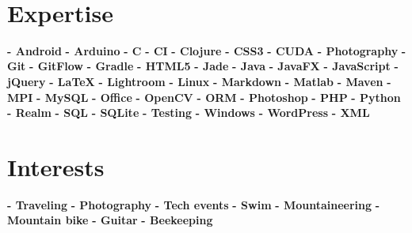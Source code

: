 \documentclass[]{friggeri-cv}
\begin{document}
\begin{aside}
~
~
~
  \section{\vspace{0.49cm}Expertise}
    \textbf{- Android}
    \textbf{- Arduino}
    \textbf{- C}
    \textbf{- CI}    
    \textbf{- Clojure}
    \textbf{- CSS3}
    \textbf{- CUDA}
    \textbf{- Photography}
    \textbf{- Git}
    \textbf{- GitFlow}    
    \textbf{- Gradle}
    \textbf{- HTML5}
    \textbf{- Jade}
    \textbf{- Java}
    \textbf{- JavaFX}
    \textbf{- JavaScript}
    \textbf{- jQuery}
    \textbf{- \LaTeX}
    \textbf{- Lightroom}
    \textbf{- Linux}
    \textbf{- Markdown}
    \textbf{- Matlab}
    \textbf{- Maven}
    \textbf{- MPI}
    \textbf{- MySQL}
    \textbf{- Office}
    \textbf{- OpenCV}
    \textbf{- ORM}
    \textbf{- Photoshop}
    \textbf{- PHP}
    \textbf{- Python}
    \textbf{- Realm}
    \textbf{- SQL}
    \textbf{- SQLite}    
    \textbf{- Testing}
    \textbf{- Windows}
    \textbf{- WordPress}
    \textbf{- XML}
    ~
  \section{Interests}
    \textbf{- Traveling}
    \textbf{- Photography}
    \textbf{- Tech events}    
    \textbf{- Swim}
    \textbf{- Mountaineering}
    \textbf{- Mountain bike}
    \textbf{- Guitar}    
    \textbf{- Beekeeping}
    ~
\end{aside}
\end{document}
